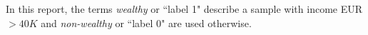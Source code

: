 In this report, the terms \emph{wealthy} or ``label 1" describe a sample with income EUR $>40K$ and \emph{non-wealthy} or ``label 0" are used otherwise.